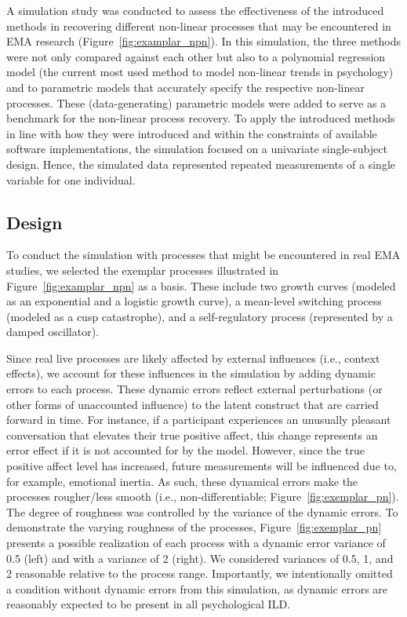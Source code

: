 \documentclass[man, floatsintext]{apa7}
\begin{document}
A simulation study was conducted to assess the effectiveness of the introduced
methods in recovering different non-linear processes that may be encountered in
EMA research (Figure~\ref{fig:examplar_npn}). In this simulation, the three
methods were not only compared against each other but also to a polynomial
regression model (the current most used method to model non-linear trends in
psychology) and to parametric models that accurately specify the respective
non-linear processes. These (data-generating) parametric models were added to
serve as a benchmark for the non-linear process recovery. To apply the
introduced methods in line with how they were introduced and within the
constraints of available software implementations, the simulation focused on a
univariate single-subject design. Hence, the simulated data represented
repeated measurements of a single variable for one individual.

\subsection{Design}

To conduct the simulation with processes that might be encountered in real EMA
studies, we selected the exemplar processes illustrated in
Figure~\ref{fig:examplar_npn} as a basis. These include two growth curves
(modeled as an exponential and a logistic growth curve), a mean-level switching
process (modeled as a cusp catastrophe), and a self-regulatory process
(represented by a damped oscillator).

Since real live processes are likely affected by external influences (i.e.,
context effects), we account for these influences in the simulation by adding
dynamic errors to each process. These dynamic errors reflect external
perturbations (or other forms of unaccounted influence) to the latent construct
that are carried forward in time. For instance, if a participant experiences an
unusually pleasant conversation that elevates their true positive affect, this
change represents an error effect if it is not accounted for by the model.
However, since the true positive affect level has increased, future
measurements will be influenced due to, for example, emotional inertia. As
such, these dynamical errors make the processes rougher/less smooth (i.e.,
non-differentiable; Figure~\ref{fig:exemplar_pn}). The degree of roughness was
controlled by the variance of the dynamic errors. To demonstrate the varying
roughness of the processes, Figure~\ref{fig:exemplar_pn} presents a possible
realization of each process with a dynamic error variance of 0.5 (left)
and with a variance of 2 (right). We considered variances of 0.5, 1,
and 2 reasonable relative to the process range. Importantly, we intentionally
omitted a condition without dynamic errors from this simulation, as dynamic
errors are reasonably expected to be present in all psychological ILD\@.
\end{document}
